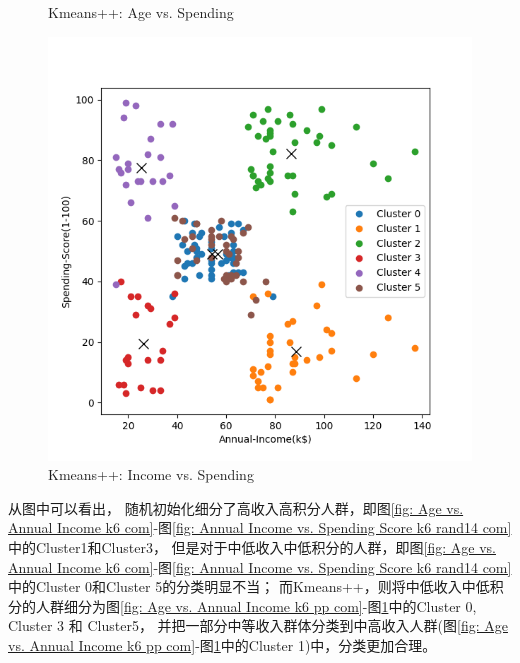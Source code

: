 \documentclass[8pt]{article}
\begin{document}
\begin{figure}[H]
\begin{minipage}{0.32\textwidth}
        \caption{Kmeans++: Age vs. Spending}
        \label{fig: Age vs. Spending Score k6 rand14 pp com}
    \end{minipage}
    \hfill
    \begin{minipage}{0.32\textwidth}
        \centering
        \includegraphics[width=\textwidth]{./Prob4/out/task2_rand14/images/cluster_result_k6_1_2.png}
        \caption{Kmeans++: Income vs. Spending}
        \label{fig: Annual Income vs. Spending Score k6 rand14 pp com}
    \end{minipage}
    \hfill
\end{figure}

从图中可以看出，
随机初始化细分了高收入高积分人群，即图\ref{fig: Age vs. Annual Income k6 com}-图\ref{fig: Annual Income vs. Spending Score k6 rand14 com}中的Cluster1和Cluster3，
但是对于中低收入中低积分的人群，即图\ref{fig: Age vs. Annual Income k6 com}-图\ref{fig: Annual Income vs. Spending Score k6 rand14 com}中的Cluster 0和Cluster 5的分类明显不当；
而Kmeans++，则将中低收入中低积分的人群细分为图\ref{fig: Age vs. Annual Income k6 pp com}-图\ref{fig: Annual Income vs. Spending Score k6 rand14 pp com}中的Cluster 0, Cluster 3 和 Cluster5，
并把一部分中等收入群体分类到中高收入人群(图\ref{fig: Age vs. Annual Income k6 pp com}-图\ref{fig: Annual Income vs. Spending Score k6 rand14 pp com}中的Cluster 1)中，分类更加合理。
\end{document}
